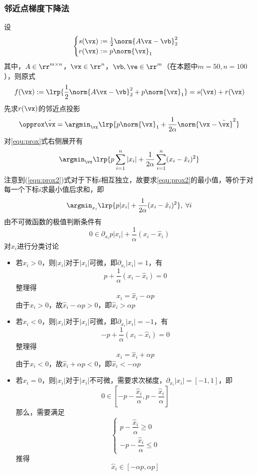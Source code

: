 \documentclass[logo,reportComp]{thesis}
\begin{document}
\subsubsection{邻近点梯度下降法}
设
\[\begin{cases}
s(\vx):=\frac{1}{2}\norm{A\vx-\vb}_2^2\\
r(\vx):=p\norm{\vx}_1
\end{cases}\]
其中，$A\in\rr^{m\times n}$，$\vx\in\rr^n$，$\vb,\ve\in\rr^m$（在本题中$m=50,n=100$），则原式
\[f(\vx):=\lrp{\frac{1}{2}\norm{A\vx-\vb}_2^2+p\norm{\vx}_1}=s(\vx)+r(\vx)\]
先求$r(\vx)$的邻近点投影
\begin{equation}
\label{equ:prox}
\opprox \hat{\vx}=\argmin_\vx\lrp{p\norm{\vx}_1+\frac{1}{2\alpha}\norm{\vx-\hat{\vx}}^2}
\end{equation}
对\ref{equ:prox}式右侧展开有
\begin{equation}
\label{equ:prox2}
\argmin_\vx\lrp{p\sum_{i=1}^n|x_i|+\frac{1}{2\alpha}\sum_{i=1}^n(x_i-\hat{x}_i)^2}
\end{equation}
注意到(\ref{equ:prox2})式对于下标$i$相互独立，故要求\ref{equ:prox2}的最小值，等价于对每一个下标$i$求最小值后求和，即
\begin{equation}
\label{equ:prox3}
\argmin_{x_i}\lrp{p|x_i|+\frac{1}{2\alpha}(x_i-\hat{x}_i)^2},\;\forall i
\end{equation}
由不可微函数的极值判断条件有
\begin{equation}
0\in\partial_{x_i}p|x_i|+\frac{1}{\alpha}(x_i-\hat{x}_i)
\end{equation}
对$x_i$进行分类讨论
\begin{itemize}
	\item 若$x_i>0$，则$|x_i|$对于$|x_i|$可微，即$\partial_{x_i}|x_i|=1$，有
	\[p+\frac{1}{\alpha}(x_i-\hat{x}_i)=0\]
	整理得
	\[x_i=\hat{x}_i-\alpha p\]
	由于$x_i>0$，故$\hat{x}_i-\alpha p>0$，即$\hat{x}_i>\alpha p$
	\item 若$x_i<0$，则$|x_i|$对于$|x_i|$可微，即$\partial_{x_i}|x_i|=-1$，有
	\[-p+\frac{1}{\alpha}(x_i-\hat{x}_i)=0\]
	整理得
	\[x_i=\hat{x}_i+\alpha p\]
	由于$x_i<0$，故$\hat{x}_i+\alpha p<0$，即$\hat{x}_i<-\alpha p$
	\item 若$x_i=0$，则$|x_i|$对于$|x_i|$不可微，需要求次梯度，$\partial_{x_i}|x_i|=[-1,1]$，即
	\[0\in\left[-p-\frac{\hat{x}_i}{\alpha},p-\frac{\hat{x}_i}{\alpha}\right]\]
	那么，需要满足
	\[\begin{cases}
	p-\dfrac{\hat{x}_i}{\alpha}\geq 0\\
	-p-\dfrac{\hat{x}_i}{\alpha}\leq 0
	\end{cases}\]
	推得
	\[\hat{x}_i\in[-\alpha p,\alpha p]\]
\end{itemize}
\end{document}
